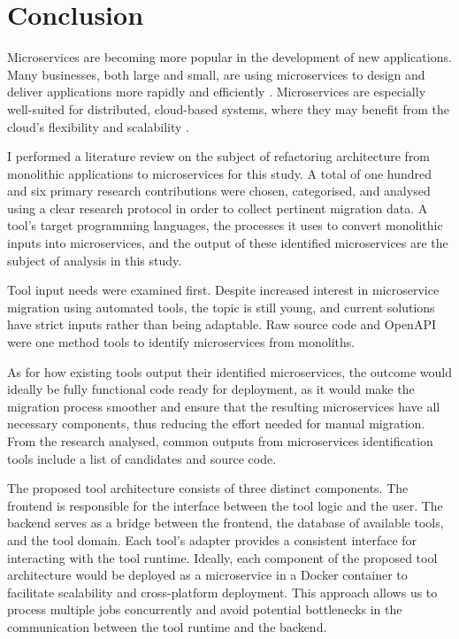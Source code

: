 \documentclass[conference]{IEEEtran}
\begin{document}
\section{Conclusion}

Microservices are becoming more popular in the development of new applications.
Many businesses, both large and small, are using microservices to design and
deliver applications more rapidly and efficiently
\cite{richardson-microservices}. Microservices are especially well-suited for
distributed, cloud-based systems, where they may benefit from the cloud's
flexibility and scalability \cite{fowler-microservices-prerequisites}.

I performed a literature review on the subject of refactoring architecture from
monolithic applications to microservices for this study. A total of one hundred
and six primary research contributions were chosen, categorised, and analysed
using a clear research protocol in order to collect pertinent migration data. A
tool's target programming languages, the processes it uses to convert
monolithic inputs into microservices, and the output of these identified
microservices are the subject of analysis in this study.

Tool input needs were examined first. Despite increased interest in
microservice migration using automated tools, the topic is still young, and
current solutions have strict inputs rather than being adaptable. Raw source
code and OpenAPI were one method tools to identify microservices from
monoliths.

As for how existing tools output their identified microservices, the outcome
would ideally be fully functional code ready for deployment, as it would make
the migration process smoother and ensure that the resulting microservices have
all necessary components, thus reducing the effort needed for manual migration.
From the research analysed, common outputs from microservices identification
tools include a list of candidates and source code.

The proposed tool architecture consists of three distinct components. The
frontend is responsible for the interface between the tool logic and the user.
The backend serves as a bridge between the frontend, the database of available
tools, and the tool domain. Each tool's adapter provides a consistent interface
for interacting with the tool runtime. Ideally, each component of the proposed
tool architecture would be deployed as a microservice in a Docker container to
facilitate scalability and cross-platform deployment. This approach allows us
to process multiple jobs concurrently and avoid potential bottlenecks in the
communication between the tool runtime and the backend.




\end{document}
